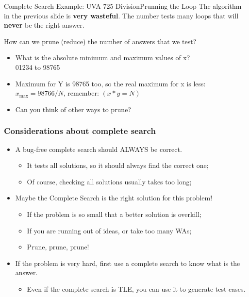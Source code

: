 \begin{frame}{Complete Search Example: UVA 725 Division}{Prunning the Loop}
  The algorithm in the previous slide is {\bf very wasteful}. The number tests many loops that will {\bf never} be the right answer.\bigskip

  How can we prune (reduce) the number of answers that we test?\bigskip

  \begin{itemize}
  \item What is the absolute minimum and maximum values of x?\\
    \hspace{1cm} 01234 to 98765
    \bigskip

  \item Maximum for Y is 98765 too, so the real maximum for x is less:\\
    \hspace{1cm} $x_{\text{max}} = 98766/N$, remember: $(x * y = N)$
    \bigskip

  \item Can you think of other ways to prune?
  \end{itemize}
\end{frame}

\begin{frame}
  \frametitle{Considerations about complete search}
  \begin{itemize}
  \item A bug-free complete search should ALWAYS be correct.\\
    \begin{itemize}
    \item It tests all solutions, so it should always find the correct one;
    \item Of course, checking all solutions usually takes too long;
    \end{itemize}

    \bigskip

  \item Maybe the Complete Search is the right solution for this problem!
    \begin{itemize}
    \item If the problem is so small that a better solution is overkill;
    \item If you are running out of ideas, or take too many WAs;
    \item Prune, prune, prune!
    \end{itemize}

    \bigskip

  \item If the problem is very hard, first use a complete search to know what is the answer.
    \begin{itemize}
    \item Even if the complete search is TLE, you can use it to generate test cases.
    \end{itemize}
  \end{itemize}
\end{frame}


